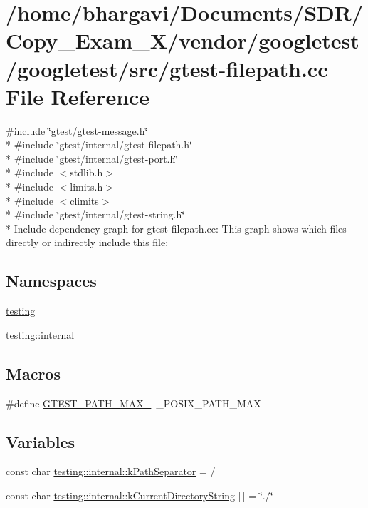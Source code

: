 \hypertarget{gtest-filepath_8cc}{}\section{/home/bhargavi/\+Documents/\+S\+D\+R/\+Copy\+\_\+\+Exam\+\_\+X/vendor/googletest/googletest/src/gtest-\/filepath.cc File Reference}
\label{gtest-filepath_8cc}
{\ttfamily \#include \char`\"{}gtest/gtest-\/message.\+h\char`\"{}}\\*
{\ttfamily \#include \char`\"{}gtest/internal/gtest-\/filepath.\+h\char`\"{}}\\*
{\ttfamily \#include \char`\"{}gtest/internal/gtest-\/port.\+h\char`\"{}}\\*
{\ttfamily \#include $<$stdlib.\+h$>$}\\*
{\ttfamily \#include $<$limits.\+h$>$}\\*
{\ttfamily \#include $<$climits$>$}\\*
{\ttfamily \#include \char`\"{}gtest/internal/gtest-\/string.\+h\char`\"{}}\\*
Include dependency graph for gtest-\/filepath.cc\+:
This graph shows which files directly or indirectly include this file\+:
\subsection*{Namespaces}
\begin{DoxyCompactItemize}
\item 
 \hyperlink{namespacetesting}{testing}
\item 
 \hyperlink{namespacetesting_1_1internal}{testing\+::internal}
\end{DoxyCompactItemize}
\subsection*{Macros}
\begin{DoxyCompactItemize}
\item 
\#define \hyperlink{gtest-filepath_8cc_ad9d445747785a9271a57cf1d392b89ad}{G\+T\+E\+S\+T\+\_\+\+P\+A\+T\+H\+\_\+\+M\+A\+X\+\_\+}~\+\_\+\+P\+O\+S\+I\+X\+\_\+\+P\+A\+T\+H\+\_\+\+M\+AX
\end{DoxyCompactItemize}
\subsection*{Variables}
\begin{DoxyCompactItemize}
\item 
const char \hyperlink{namespacetesting_1_1internal_afcd71adaa9d1e6df7b282a17fc48125c}{testing\+::internal\+::k\+Path\+Separator} = \textquotesingle{}/\textquotesingle{}
\item 
const char \hyperlink{namespacetesting_1_1internal_a23a8e9527d0e544e7df2d64ad549ce3e}{testing\+::internal\+::k\+Current\+Directory\+String} \mbox{[}$\,$\mbox{]} = \char`\"{}./\char`\"{}
\end{DoxyCompactItemize}


